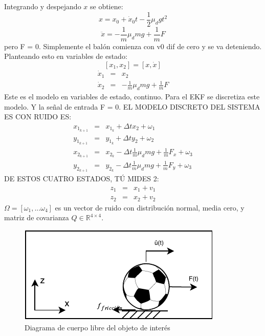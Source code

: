 Integrando y despejando $x$ se obtiene:
\begin{equation}
x = x_0 + \dot{x}_0 t - \frac{1}{2} \mu_d g t^2
\label{eq:position_prediction}
\end{equation}
\[\ddot{x} = -\frac{1}{m}\mu_d m g + \frac{1}{m}F\]
pero F = 0. Simplemente el balón comienza con v0 dif de cero y se va deteniendo.
Planteando esto en variables de estado:
\[ [x_1,x_2] = [x, \dot{x}]\]
\begin{eqnarray*}
\dot{x}_1 &=& x_2\\
\dot{x}_2 &=& -\frac{1}{m}\mu_d m g + \frac{1}{m}F
\end{eqnarray*}
Este es el modelo en variables de estado, continuo. 
Para el EKF se discretiza este modelo. Y la señal de entrada F = 0. 
EL MODELO DISCRETO DEL SISTEMA ES CON RUIDO ES:
\begin{eqnarray*}
x_{1_{k+1}} &=& x_{1_k} + \Delta t x_2 + \omega_1\\ %
y_{1_{k+1}} &=& y_{1_k} + \Delta t y_2 + \omega_2\\ %
x_{2_{k+1}} &=& x_{2_k} - \Delta t \frac{1}{m}\mu_d m g + \frac{1}{m}F_x + \omega_3\\ %
y_{2_{k+1}} &=& y_{2_k} - \Delta t \frac{1}{m}\mu_d m g + \frac{1}{m}F_y + \omega_3 %
\end{eqnarray*}
DE ESTOS CUATRO ESTADOS, TÚ MIDES 2:
\begin{eqnarray*}
z_1 &=& x_1 + v_1\\
z_2 &=& x_2 + v_2
\end{eqnarray*}
$\Omega = [\omega_1, ... \omega_4]$ es un vector de ruido con distribución normal, media cero, y matriz de covarianza $Q\in \mathbb{R}^{4\times 4}$.

\begin{figure}
\centering
\includegraphics[scale=1.5]{images/dynamic_model.pdf}
\caption{Diagrama de cuerpo libre del objeto de interés}
\label{fig:dynamic_model}
\end{figure}

